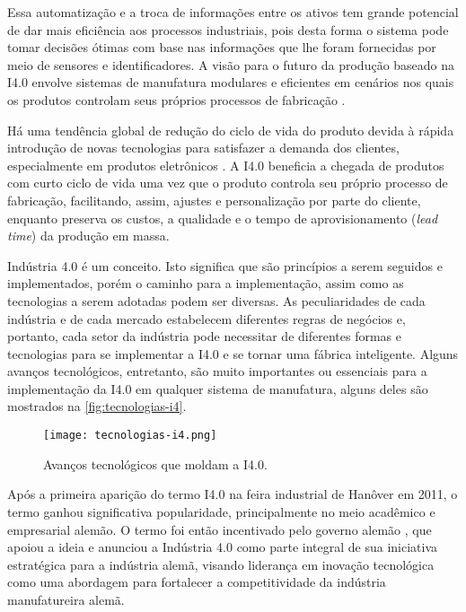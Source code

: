 	Essa automatização e a troca de informações entre os ativos tem grande potencial de dar mais eficiência aos processos industriais, pois desta forma o sistema pode tomar decisões ótimas com base nas informações que lhe foram fornecidas por meio de sensores e identificadores. A visão para o futuro da produção baseado na I4.0 envolve sistemas de manufatura modulares e eficientes em cenários nos quais os produtos controlam seus próprios processos de fabricação \cite{lasi2014industryfour}.
	
	Há uma tendência global de redução do ciclo de vida do produto devida à rápida introdução de novas tecnologias para satisfazer a demanda dos clientes, especialmente em produtos eletrônicos \cite{trappey2008lifecycle}. A I4.0 beneficia a chegada de produtos com curto ciclo de vida uma vez que o produto controla seu próprio processo de fabricação, facilitando, assim, ajustes e personalização por parte do cliente, enquanto preserva os custos, a qualidade e o tempo de aprovisionamento (\textit{lead time}) da produção em massa.
	
	Indústria 4.0 é um conceito. Isto significa que são princípios a serem seguidos e implementados, porém o caminho para a implementação, assim como as tecnologias a serem adotadas podem ser diversas. As peculiaridades de cada indústria e de cada mercado estabelecem diferentes regras de negócios e, portanto, cada setor da indústria pode necessitar de diferentes formas e tecnologias para se implementar a I4.0 e se tornar uma fábrica inteligente. Alguns avanços tecnológicos, entretanto, são muito importantes ou essenciais para a implementação da I4.0 em qualquer sistema de manufatura, alguns deles são mostrados na \autoref{fig:tecnologias-i4}.
	
	\begin{figure}[htb]
		\centering
		\caption{Avanços tecnológicos que moldam a I4.0.}
		\label{fig:tecnologias-i4}
		\texttt{[image: tecnologias-i4.png]}
	\end{figure}

	Após a primeira aparição do termo I4.0 na feira industrial de Hanôver em 2011, o termo ganhou significativa popularidade, principalmente no meio acadêmico e empresarial alemão. O termo foi então incentivado pelo governo alemão \cite{lasi2014industryfour, kagermann2013recommendations}, que apoiou a ideia e anunciou a Indústria 4.0 como parte integral de sua iniciativa estratégica para a indústria alemã, visando liderança em inovação tecnológica \cite{drath2014industrie} como uma abordagem para fortalecer a competitividade da indústria manufatureira alemã.	

